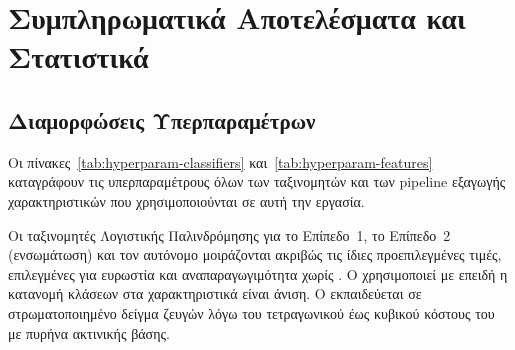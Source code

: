 

\chapter{Συμπληρωματικά Αποτελέσματα και Στατιστικά}
\label{ch:a}


\section{Διαμορφώσεις Υπερπαραμέτρων}
\label{sec:hyperparams}

Οι πίνακες~\ref{tab:hyperparam-classifiers} και~\ref{tab:hyperparam-features} καταγράφουν
τις υπερπαραμέτρους όλων των ταξινομητών και των pipeline εξαγωγής χαρακτηριστικών που
χρησιμοποιούνται σε αυτή την εργασία.

Οι ταξινομητές Λογιστικής Παλινδρόμησης για το Επίπεδο~1, το Επίπεδο~2 (ενσωμάτωση) και
τον αυτόνομο \texttt{} μοιράζονται ακριβώς τις ίδιες προεπιλεγμένες τιμές,
επιλεγμένες για ευρωστία και αναπαραγωγιμότητα χωρίς .
Ο \texttt{} χρησιμοποιεί  με \texttt{}
επειδή η κατανομή κλάσεων στα χαρακτηριστικά  είναι άνιση.
Ο \texttt{} εκπαιδεύεται σε στρωματοποιημένο δείγμα \SvmSampleSize{} ζευγών
λόγω του τετραγωνικού έως κυβικού κόστους του  με πυρήνα ακτινικής βάσης.

